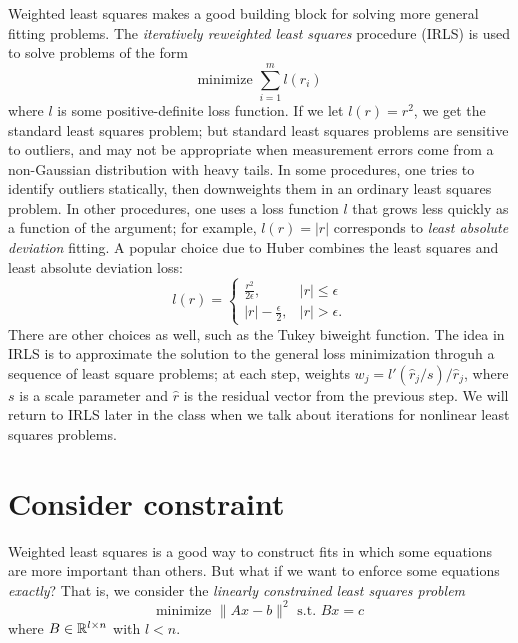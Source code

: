 \documentclass[12pt, leqno]{article}
\begin{document}
Weighted least squares makes a good building block for solving
more general fitting problems.
The {\em iteratively reweighted least squares} procedure (IRLS)
is used to solve problems of the form
\[
  \mbox{minimize } \sum_{i=1}^m l(r_i)
\]
where $l$ is some positive-definite loss function.  If we let
$l(r) = r^2$, we get the standard least squares problem; but
standard least squares problems are sensitive to outliers,
and may not be appropriate when measurement errors come from
a non-Gaussian distribution with heavy tails.  In some procedures,
one tries to identify outliers statically, then downweights them
in an ordinary least squares problem.  In other procedures,
one uses a loss function $l$ that grows less quickly as a function
of the argument; for example, $l(r) = |r|$ corresponds to
{\em least absolute deviation} fitting.  A popular choice due to
Huber combines the least squares and least absolute deviation loss:
\[
l(r) = \begin{cases}
  \frac{r^2}{2\epsilon}, & |r| \leq \epsilon \\
  |r|-\frac{\epsilon}{2}, & |r| > \epsilon.
  \end{cases}
\]
There are other choices as well, such as the Tukey biweight function.
The idea in IRLS is to approximate the solution to the general loss
minimization throguh a sequence of least square problems; at each
step, weights $w_j = l'(\hat{r}_j/s)/\hat{r}_j$, where $s$ is a scale
parameter and $\hat{r}$ is the residual vector from the previous step.
We will return to IRLS later in the class when we talk about
iterations for nonlinear least squares problems.

\section*{Consider constraint}

Weighted least squares is a good way to construct fits in which some
equations are more important than others.  But what if we want to
enforce some equations {\em exactly}?  That is, we consider the
{\em linearly constrained least squares problem}
\[
  \mbox{minimize } \|Ax-b\|^2 \mbox{ s.t. } Bx = c
\]
where $B \in \mathbb{R}^{l \times n}$ with $l < n$.
\end{document}
